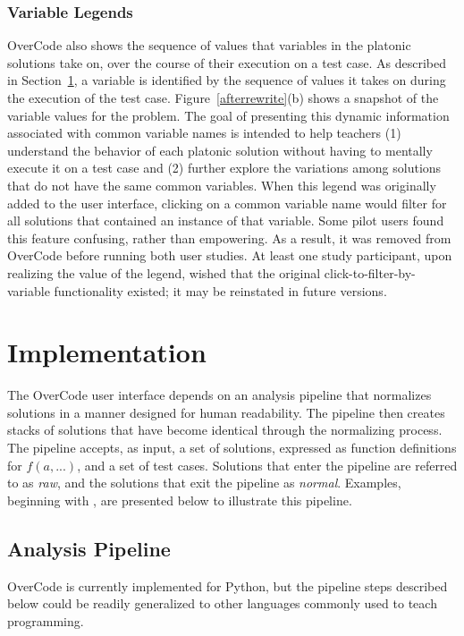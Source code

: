 \subsubsection{Variable Legends} OverCode also shows the sequence of values that variables in the platonic solutions take on, over the course of their execution on a test case. As described in Section~\ref{pipeline}, a variable is identified by the sequence of values it takes on during the execution of the test case. Figure~\ref{afterrewrite}(b) shows a snapshot of the variable values for the  problem. The goal of presenting this dynamic information associated with common variable names is intended to help teachers (1) understand the behavior of each platonic solution without having to mentally execute it on a test case and (2) further explore the variations among solutions that do not have the same common variables. When this legend was originally added to the user interface, clicking on a common variable name would filter for all solutions that contained an instance of that variable. Some pilot users found this feature confusing, rather than empowering. As a result, it was removed from OverCode before running both user studies. At least one study participant, upon realizing the value of the legend, wished that the original click-to-filter-by-variable functionality existed; it may be reinstated in future versions.

\section{Implementation} \label{pipeline}
The OverCode user interface depends on an analysis pipeline that normalizes solutions in a manner designed for human readability. The pipeline then creates stacks of solutions that have become identical through the normalizing process. The pipeline accepts, as input, a set of solutions, expressed as function definitions for $f(a,...)$, and a set of test cases. Solutions that enter the pipeline are referred to as \emph{raw}, and the solutions that exit the pipeline as \emph{normal}. Examples, beginning with , are presented below to illustrate this pipeline.

\subsection{Analysis Pipeline}
OverCode is currently implemented for Python, but the pipeline steps described below could be readily generalized to other languages commonly used to teach programming.

